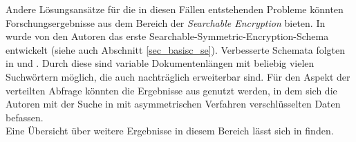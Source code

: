 Andere Lösungsansätze für die in diesen Fällen entstehenden Probleme könnten Forschungsergebnisse aus dem Bereich der \textit{Searchable Encryption} bieten. In \cite{song2000practical} wurde von den Autoren das erste Searchable-Symmetric-Encryption-Schema entwickelt (siehe auch Abschnitt \ref{sec_basisc_se}). Verbesserte Schemata folgten in \cite{goh2003} und \cite{chang2005}. Durch diese sind variable Dokumentenlängen mit beliebig vielen Suchwörtern möglich, die auch nachträglich erweiterbar sind. Für den Aspekt der verteilten Abfrage könnten die Ergebnisse aus \cite{boneh2004public} genutzt werden, in dem sich die Autoren mit der Suche in mit asymmetrischen Verfahren verschlüsselten Daten befassen.\\
Eine Übersicht über weitere Ergebnisse in diesem Bereich lässt sich in \cite{wang2016} finden.